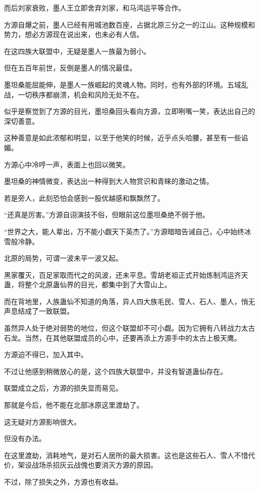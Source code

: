 \begin{this_body}
而后刘家衰败，墨人王立即舍弃刘家，和马鸿运平等合作。

方源自爆之前，墨人已经有用城池数百座，占据北原三分之一的江山。这种规模和势力，想必方源现在说出来，也未必有人信。

在这四族大联盟中，无疑是墨人一族最为弱小。

但在五百年前世，反倒是墨人的情况最佳。

墨坦桑能屈能伸，是墨人一族崛起的灵魂人物。同时，也有外部的环境。五域乱战，一切秩序都崩溃，机会和风险无处不在。

似乎是察觉到了方源的目光，墨坦桑回头看向方源，立即咧嘴一笑，表达出自己的深切善意。

这种善意是如此浓郁和明显，以至于他笑的时候，近乎点头哈腰，甚至有一些谄媚。

方源心中冷哼一声，表面上也回以微笑。

墨坦桑的神情微变，表达出一种得到大人物赏识和青睐的激动之情。

若是旁人，此刻恐怕会感到一股优越感和飘飘然了。

“还真是厉害。”方源自诩演技不俗，但眼前这位墨坦桑绝不弱于他。

“世界之大，能人辈出，万不能小觑天下英杰了。”方源暗暗告诫自己，心中始终冰雪般冷静。

北原的局势，可谓一波未平一波又起。

黑家覆灭，百足家取而代之的风波，还未平息。雪胡老祖正式开始炼制鸿运齐天蛊，将整个北原蛊仙界的目光，都集中到了大雪山上。

而在背地里，人族蛊仙不知道的角落，异人四大族毛民、雪人、石人、墨人，悄无声息结成了一致联盟。

虽然异人处于绝对弱势的地位，但这个联盟却不可小觑。因为它拥有八转战力太古石龙。当然，在其他联盟成员的心中，还要再添上方源手中的太古上极天鹰。

方源迫不得已，加入其中。

不过让他感到稍微放心的是，这个四族大联盟中，并没有智道蛊仙存在。

联盟成立之后，方源的损失显而易见。

那就是今后，他不能在北部冰原这里渡劫了。

这无疑对方源影响很大。

但没有办法。

在这里渡劫，消耗地气，是对石人居所的最大损害。这也是这些石人、雪人不惜代价，架设战场杀招灰云战傀也要消灭方源的原因。

不过，除了损失之外，方源也有收益。


\end{this_body}
